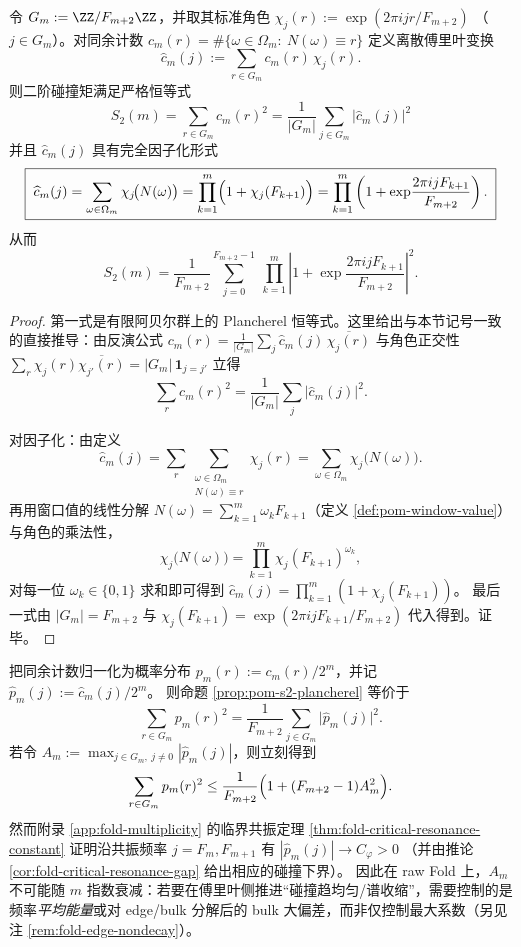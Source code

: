 \begin{proposition}\label{prop:pom-s2-plancherel}
令 \(G_m:=\ZZ/F_{m+2}\ZZ\)，并取其标准角色
\(
\chi_j(r):=\exp(2\pi i jr/F_{m+2})
\)
（\(j\in G_m\)）。对同余计数 \(c_m(r)=\#\{\omega\in\Omega_m:\ N(\omega)\equiv r\}\) 定义离散傅里叶变换
\[
\widehat c_m(j):=\sum_{r\in G_m} c_m(r)\,\chi_j(r).
\]
则二阶碰撞矩满足严格恒等式
\[
\boxed{\;
S_2(m)=\sum_{r\in G_m}c_m(r)^2=\frac{1}{|G_m|}\sum_{j\in G_m}\bigl|\widehat c_m(j)\bigr|^2\;}
\]
并且 \(\widehat c_m(j)\) 具有完全因子化形式
\[
\boxed{\;
\widehat c_m(j)=\sum_{\omega\in\Omega_m}\chi_j\!\bigl(N(\omega)\bigr)
=\prod_{k=1}^m\Bigl(1+\chi_j(F_{k+1})\Bigr)
=\prod_{k=1}^m\left(1+\exp\!\frac{2\pi i j F_{k+1}}{F_{m+2}}\right).\;}
\]
从而
\[
S_2(m)
=\frac{1}{F_{m+2}}\sum_{j=0}^{F_{m+2}-1}\ \prod_{k=1}^m\left|1+\exp\!\frac{2\pi i j F_{k+1}}{F_{m+2}}\right|^2.
\]
\end{proposition}
\begin{proof}
第一式是有限阿贝尔群上的 Plancherel 恒等式。这里给出与本节记号一致的直接推导：由反演公式
\(
c_m(r)=\frac{1}{|G_m|}\sum_{j}\widehat c_m(j)\,\overline{\chi_j(r)}
\)
与角色正交性
\(
\sum_{r}\chi_j(r)\overline{\chi_{j'}(r)}=|G_m|\,\mathbf{1}_{j=j'}
\)
立得
\[
\sum_{r}c_m(r)^2
=\frac{1}{|G_m|}\sum_{j}|\widehat c_m(j)|^2.
\]

对因子化：由定义
\[
\widehat c_m(j)
=\sum_{r}\sum_{\substack{\omega\in\Omega_m\\N(\omega)\equiv r}}\chi_j(r)
=\sum_{\omega\in\Omega_m}\chi_j\!\bigl(N(\omega)\bigr).
\]
再用窗口值的线性分解 \(N(\omega)=\sum_{k=1}^m \omega_k F_{k+1}\)（定义 \ref{def:pom-window-value}）与角色的乘法性，
\[
\chi_j\!\bigl(N(\omega)\bigr)
=\prod_{k=1}^m \chi_j(F_{k+1})^{\omega_k},
\]
对每一位 \(\omega_k\in\{0,1\}\) 求和即可得到
\(
\widehat c_m(j)=\prod_{k=1}^m(1+\chi_j(F_{k+1}))
\)。
最后一式由 \(|G_m|=F_{m+2}\) 与 \(\chi_j(F_{k+1})=\exp(2\pi i jF_{k+1}/F_{m+2})\) 代入得到。证毕。
\end{proof}

\begin{remark}[最大非平凡傅里叶系数证书与临界共振的阻碍]\label{rem:pom-max-fourier-obstruction}
把同余计数归一化为概率分布 \(p_m(r):=c_m(r)/2^m\)，并记 \(\widehat p_m(j):=\widehat c_m(j)/2^m\)。
则命题 \ref{prop:pom-s2-plancherel} 等价于
\[
\sum_{r\in G_m}p_m(r)^2=\frac{1}{F_{m+2}}\sum_{j\in G_m}\bigl|\widehat p_m(j)\bigr|^2.
\]
若令 \(A_m:=\max_{j\in G_m,\ j\neq 0}|\widehat p_m(j)|\)，则立刻得到
\[
\sum_{r\in G_m}p_m(r)^2\le \frac{1}{F_{m+2}}\Bigl(1+(F_{m+2}-1)A_m^2\Bigr).
\]
然而附录 \ref{app:fold-multiplicity} 的临界共振定理 \ref{thm:fold-critical-resonance-constant} 证明沿共振频率 \(j=F_m,F_{m+1}\) 有
\(
|\widehat p_m(j)|\to C_\varphi>0
\)
（并由推论 \ref{cor:fold-critical-resonance-gap} 给出相应的碰撞下界）。
因此在 raw Fold 上，\(A_m\) 不可能随 \(m\) 指数衰减：若要在傅里叶侧推进“碰撞趋均匀/谱收缩”，需要控制的是频率\emph{平均能量}或对 edge/bulk 分解后的 bulk 大偏差，而非仅控制最大系数（另见注 \ref{rem:fold-edge-nondecay}）。
\end{remark}

